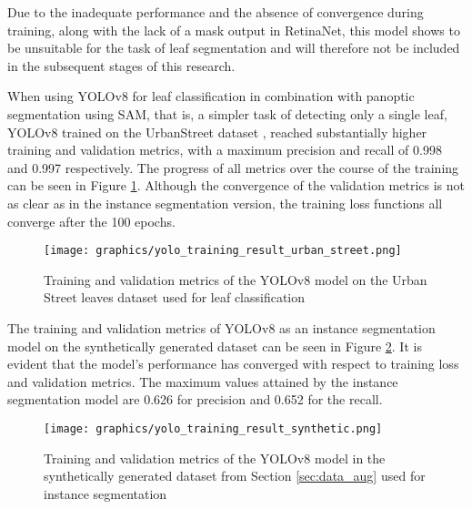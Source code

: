 \documentclass[draft,final]{vutinfth} %
\begin{document}
\begin{appendix}
Due to the inadequate performance and the absence of convergence during training, along with the lack of a mask output in RetinaNet, this model shows to be unsuitable for the task of leaf segmentation and will therefore not be included in the subsequent stages of this research.

When using YOLOv8 for leaf classification in combination with panoptic segmentation using SAM, that is, a simpler task of detecting only a single leaf, YOLOv8 trained on the UrbanStreet dataset \cite{yang_urban_2023}, reached substantially higher training and validation metrics, with a maximum precision and recall of 0.998 and 0.997 respectively. The progress of all metrics over the course of the training can be seen in Figure \ref{fig:yolo_training_metrics_us}. Although the convergence of the validation metrics is not as clear as in the instance segmentation version, the training loss functions all converge after the 100 epochs.

\begin{figure}
    \centering
    \texttt{[image: graphics/yolo\_training\_result\_urban\_street.png]}
    \caption{Training and validation metrics of the YOLOv8 model on the Urban Street leaves dataset \cite{yang_urban_2023} used for leaf classification}
    \label{fig:yolo_training_metrics_us}
\end{figure}

The training and validation metrics of YOLOv8 as an instance segmentation model on the synthetically generated dataset can be seen in Figure \ref{fig:yolo_training_metrics_synthetic}. It is evident that the model's performance has converged with respect to training loss and validation metrics. The maximum values attained by the instance segmentation model are 0.626 for precision and 0.652 for the recall.

\begin{figure}
    \centering
    \texttt{[image: graphics/yolo\_training\_result\_synthetic.png]}
    \caption{Training and validation metrics of the YOLOv8 model in the synthetically generated dataset from Section \ref{sec:data_aug} used for instance segmentation}
    \label{fig:yolo_training_metrics_synthetic}
\end{figure}


\end{appendix}
\end{document}
